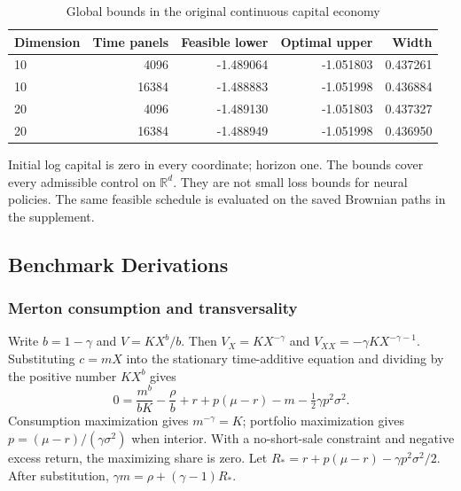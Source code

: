 \documentclass[ecta,nameyear,draft]{econsocart}
\theoremstyle{definition}
\theoremstyle{remark}
\begin{document}
\begin{table}[htbp]
\centering\small\setlength{\tabcolsep}{4pt}
\caption{Global bounds in the original continuous capital economy}\label{tab:r9capital}
\begin{tabular}{lrrrr}
\toprule
Dimension & Time panels & Feasible lower & Optimal upper & Width \\
\midrule
10 & 4096 & -1.489064 & -1.051803 & 0.437261 \\
10 & 16384 & -1.488883 & -1.051998 & 0.436884 \\
20 & 4096 & -1.489130 & -1.051803 & 0.437327 \\
20 & 16384 & -1.488949 & -1.051998 & 0.436950 \\
\bottomrule
\end{tabular}
\par\vspace{3pt}\begin{minipage}{0.97\linewidth}\footnotesize Initial log capital is zero in every coordinate; horizon one. The bounds cover every admissible control on $\mathbb R^d$. They are not small loss bounds for neural policies. The same feasible schedule is evaluated on the saved Brownian paths in the supplement.\end{minipage}
\end{table}






\subsection{Benchmark Derivations}
\subsubsection{Merton consumption and transversality}
Write $b=1-\gamma$ and $V=KX^b/b$. Then $V_X=KX^{-\gamma}$ and $V_{XX}=-\gamma KX^{-\gamma-1}$. Substituting $c=mX$ into the stationary time-additive equation and dividing by the positive number $KX^b$ gives
\[
 0=\frac{m^b}{bK}-\frac\rho b+r+p(\mu-r)-m-\tfrac12\gamma p^2\sigma^2.
\]
Consumption maximization gives $m^{-\gamma}=K$; portfolio maximization gives $p=(\mu-r)/(\gamma\sigma^2)$ when interior. With a no-short-sale constraint and negative excess return, the maximizing share is zero. Let $R_*=r+p(\mu-r)-\gamma p^2\sigma^2/2$. After substitution, $\gamma m=\rho+(\gamma-1)R_*$.
\end{document}

